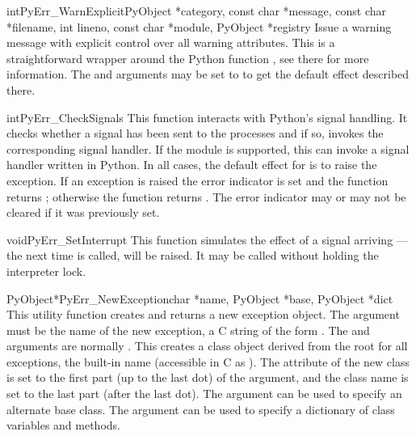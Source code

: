 \begin{cfuncdesc}{int}{PyErr_WarnExplicit}{PyObject *category, 
                const char *message, const char *filename, int lineno, 
                const char *module, PyObject *registry}
  Issue a warning message with explicit control over all warning
  attributes.  This is a straightforward wrapper around the Python
  function , see there for more
  information.  The  and  arguments may be
  set to \NULL{} to get the default effect described there.
\end{cfuncdesc}

\begin{cfuncdesc}{int}{PyErr_CheckSignals}{}
  This function interacts with Python's signal handling.  It checks
  whether a signal has been sent to the processes and if so, invokes
  the corresponding signal handler.  If the
   module is supported, this can
  invoke a signal handler written in Python.  In all cases, the
  default effect for  is to raise the
   exception.  If an exception is raised
  the error indicator is set and the function returns ;
  otherwise the function returns .  The error indicator may or
  may not be cleared if it was previously set.
\end{cfuncdesc}

\begin{cfuncdesc}{void}{PyErr_SetInterrupt}{}
  This function simulates the effect of a
   signal arriving --- the next time
   is called,
   will be raised.  It may be called
  without holding the interpreter lock.
\end{cfuncdesc}

\begin{cfuncdesc}{PyObject*}{PyErr_NewException}{char *name,
                                                 PyObject *base,
                                                 PyObject *dict}
  This utility function creates and returns a new exception object.
  The  argument must be the name of the new exception, a C
  string of the form .  The  and
   arguments are normally \NULL.  This creates a class
  object derived from the root for all exceptions, the built-in name
   (accessible in C as ).
  The  attribute of the new class is set to the
  first part (up to the last dot) of the  argument, and the
  class name is set to the last part (after the last dot).  The
   argument can be used to specify an alternate base class.
  The  argument can be used to specify a dictionary of class
  variables and methods.
\end{cfuncdesc}

